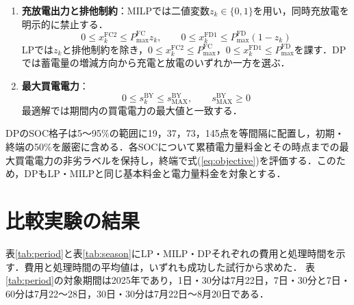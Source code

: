 \documentclass[a4paper,11pt,xelatex,ja=standard]{bxjsarticle}
\begin{document}
\begin{enumerate}
    \item \textbf{充放電出力と排他制約}：MILPでは二値変数$z_k\in\{0,1\}$を用い，同時充放電を明示的に禁止する．
          \begin{equation}
              0\leq x^{\mathrm{FC2}}_k\leq P^{\mathrm{FC}}_{\mathrm{max}}z_k,
              \qquad
              0\leq x^{\mathrm{FD1}}_k\leq P^{\mathrm{FD}}_{\mathrm{max}}(1-z_k)
              \label{eq:exclusive}
          \end{equation}
          LPでは$z_k$と排他制約を除き，$0\leq x^{\mathrm{FC2}}_k\leq P^{\mathrm{FC}}_{\mathrm{max}}$，$0\leq x^{\mathrm{FD1}}_k\leq P^{\mathrm{FD}}_{\mathrm{max}}$を課す．DPでは蓄電量の増減方向から充電と放電のいずれか一方を選ぶ．

    \item \textbf{最大買電電力}：
          \begin{equation}
              0\leq s^{\mathrm{BY}}_k\leq s^{\mathrm{BY}}_{\mathrm{MAX}},
              \qquad s^{\mathrm{BY}}_{\mathrm{MAX}}\geq0
              \label{eq:max-buy}
          \end{equation}
          最適解では期間内の買電電力の最大値と一致する．
\end{enumerate}

DPのSOC格子は5～95\%の範囲に19，37，73，145点を等間隔に配置し，初期・終端の50\%を厳密に含める．各SOCについて累積電力量料金とその時点までの最大買電電力の非劣ラベルを保持し，終端で式(\ref{eq:objective})を評価する．このため，DPもLP・MILPと同じ基本料金と電力量料金を対象とする．

\section{比較実験の結果}
表\ref{tab:period}と表\ref{tab:season}にLP・MILP・DPそれぞれの費用と処理時間を示す．費用と処理時間の平均値は，いずれも成功した試行から求めた．
表\ref{tab:period}の対象期間は2025年であり，1日・30分は7月22日，7日・30分と7日・60分は7月22～28日，30日・30分は7月22日～8月20日である．
\end{document}

